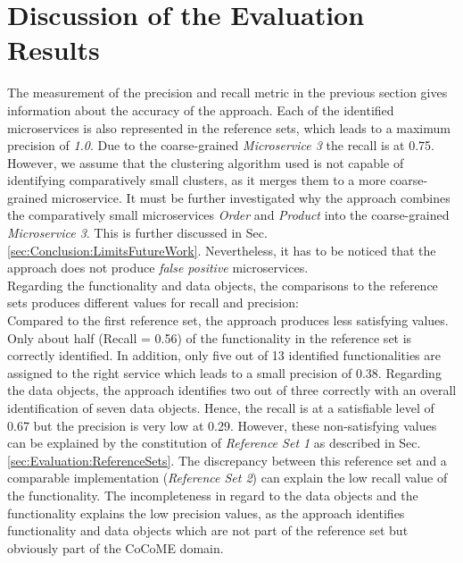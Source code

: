 \section{Discussion of the Evaluation Results}
\label{sec:Evalutation:Results}
The measurement of the precision and recall metric in the previous section gives information about the accuracy of the approach. Each of the identified microservices is also represented in the reference sets, which leads to a maximum precision of \textit{1.0}. Due to the coarse-grained \textit{Microservice 3} the recall is at 0.75. \\
However, we assume that the clustering algorithm used is not capable of identifying comparatively small clusters, as it merges them to a more coarse-grained microservice. It must be further investigated why the approach combines the comparatively small microservices \textit{Order} and \textit{Product} into the coarse-grained \textit{Microservice 3}. This is further discussed in Sec.\ref{sec:Conclusion:LimitsFutureWork}. Nevertheless, it has to be noticed that the approach does not produce \textit{false positive} microservices. \\
Regarding the functionality and data objects, the comparisons to the reference sets produces different values for recall and precision:\\

\noindent
Compared to the first reference set, the approach produces less 
satisfying values. Only about half (Recall = 0.56) of the functionality in the reference set is correctly identified.  In addition, only five out of 13 identified functionalities are assigned to the right service which leads to a small precision of 0.38. Regarding the data objects, the approach identifies two out of three correctly with an overall identification of seven data objects. Hence, the recall is at a satisfiable level of 0.67 but the precision is very low at 0.29. However, these non-satisfying values can be explained by the constitution of \textit{Reference Set 1} as described in Sec.\ref{sec:Evaluation:ReferenceSets}. The discrepancy between this reference set and a comparable implementation (\textit{Reference Set 2}) can explain the low recall value of the functionality. The incompleteness in regard to the data objects and the functionality explains the low precision values, as the approach identifies functionality and data objects which are not part of the reference set but obviously part of the CoCoME domain.\\

